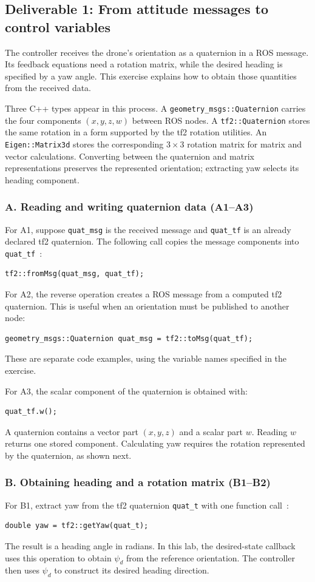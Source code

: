 \documentclass[12pt,a4paper,twoside]{article}
\begin{document}
\subsection{Deliverable 1: From attitude messages to control variables}
The controller receives the drone's orientation as a quaternion in a ROS message. Its feedback equations need a rotation matrix, while the desired heading is specified by a yaw angle. This exercise explains how to obtain those quantities from the received data.

Three C++ types appear in this process. A \texttt{geometry\_msgs::Quaternion} carries the four components $(x,y,z,w)$ between ROS nodes. A \texttt{tf2::Quaternion} stores the same rotation in a form supported by the tf2 rotation utilities. An \texttt{Eigen::Matrix3d} stores the corresponding $3\times3$ rotation matrix for matrix and vector calculations. Converting between the quaternion and matrix representations preserves the represented orientation; extracting yaw selects its heading component.

\subsubsection*{A. Reading and writing quaternion data (A1--A3)}
For A1, suppose \texttt{quat\_msg} is the received message and \texttt{quat\_tf} is an already declared tf2 quaternion. The following call copies the message components into \texttt{quat\_tf}~\citep{rosgeometry}:
\begin{lstlisting}
tf2::fromMsg(quat_msg, quat_tf);
\end{lstlisting}
For A2, the reverse operation creates a ROS message from a computed tf2 quaternion. This is useful when an orientation must be published to another node:
\begin{lstlisting}
geometry_msgs::Quaternion quat_msg = tf2::toMsg(quat_tf);
\end{lstlisting}
These are separate code examples, using the variable names specified in the exercise.

For A3, the scalar component of the quaternion is obtained with:
\begin{lstlisting}
quat_tf.w();
\end{lstlisting}
A quaternion contains a vector part $(x,y,z)$ and a scalar part $w$. Reading $w$ returns one stored component. Calculating yaw requires the rotation represented by the quaternion, as shown next.

\subsubsection*{B. Obtaining heading and a rotation matrix (B1--B2)}
For B1, extract yaw from the tf2 quaternion \texttt{quat\_t} with one function call~\citep{rosutils}:
\begin{lstlisting}
double yaw = tf2::getYaw(quat_t);
\end{lstlisting}
The result is a heading angle in radians. In this lab, the desired-state callback uses this operation to obtain $\psi_d$ from the reference orientation. The controller then uses $\psi_d$ to construct its desired heading direction.
\end{document}
